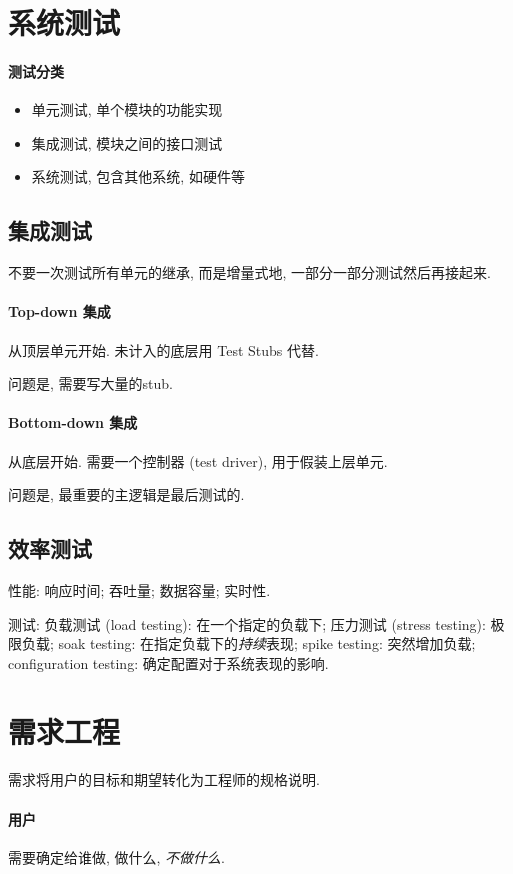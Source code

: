 \documentclass{ctexart}
\begin{document}
\section{系统测试}
\paragraph{测试分类}\begin{itemize}
        \item 单元测试, 单个模块的功能实现
        \item 集成测试, 模块之间的接口测试
        \item 系统测试, 包含其他系统, 如硬件等
    \end{itemize}
\subsection{集成测试}
    不要一次测试所有单元的继承, 而是增量式地, 一部分一部分测试然后再接起来.
\paragraph{Top-down 集成}
    从顶层单元开始. 未计入的底层用 Test Stubs 代替.\par
    问题是, 需要写大量的stub.
\paragraph{Bottom-down 集成}
    从底层开始. 需要一个控制器 (test driver), 用于假装上层单元.\par
    问题是, 最重要的主逻辑是最后测试的.

\subsection{效率测试}
    性能: 响应时间; 吞吐量; 数据容量; 实时性.\par
    测试: 负载测试 (load testing): 在一个指定的负载下;
        压力测试 (stress testing): 极限负载;
        soak testing: 在指定负载下的\emph{持续}表现;
        spike testing: 突然增加负载;
        configuration testing: 确定配置对于系统表现的影响.\par

\section{需求工程}
    需求将用户的目标和期望转化为工程师的规格说明.
\paragraph{用户}
    需要确定给谁做, 做什么, \emph{不做什么}.
\end{document}
